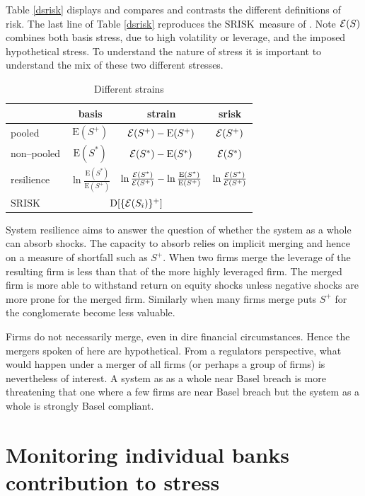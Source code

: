 \documentclass[authoryear]{elsarticle}
\newcommand{\E}{\mathrm{E}}
\newcommand{\Ex}{{\cal E}}
\newcommand{\Es}{\Ex}
\newcommand{\SR}{\ensuremath{\mathrm{SRISK}}}
\newcommand{\tref}[1]{Table \ref{#1}}
\newcommand{\D}{\mathrm{D}}
\begin{document}
 \tref{dsrisk} displays and compares and contrasts the different definitions of risk. The last line of \tref{dsrisk} reproduces the \SR\  measure of \cite{brownlees2015}. Note $\Es(S)$ combines both basis stress, due to high volatility or leverage, and the imposed hypothetical stress. To understand the nature of stress it is important to understand the mix of these two different stresses.
 
 
\begin{table}[htbp]
\caption{Different strains}\label{dsrisk}
\begin{center}
\begin{tabular}{l|c|c|c}
\hline
& basis & strain & srisk\\
\hline
pooled &$\E(S^+)$ &$ \Ex(S^+)-\E(S^+)$ & $\Ex(S^+)$\\
non--pooled & $\E(S^*)$& $\Ex(S^*)-\E(S^*)$&$\Ex(S^*)$\\
\hline
resilience & $\ln\frac{\E(S^*)}{\E(S^+)}$& $\ln\frac{\Ex(S^*)}{\Ex(S^+)}-\ln\frac{\E(S^*)}{\E(S^+)}$&$\ln\frac{\Ex(S^*)}{\Ex(S^+)}$ \\
\hline
\SR & \multicolumn{2}{c}{$\D[\{\Ex(S_i)\}^+]$}\\
\hline
\end{tabular}
\end{center}
\label{default}
\end{table}%

System resilience aims to answer the question of whether the system as a whole can absorb shocks.   The capacity to absorb relies on implicit merging and hence on a measure of shortfall such as $S^+$.    When two firms merge the leverage of the resulting firm is less than that of the more highly leveraged firm.   The merged firm is more able to withstand return on equity shocks  unless negative shocks are more prone for the merged firm.   Similarly when many firms merge  puts $S^+$ for the conglomerate become less valuable.

Firms do not necessarily merge, even in dire financial circumstances.   Hence the mergers spoken of here are hypothetical.   From a regulators perspective, what would happen under a merger of all firms (or perhaps a group of firms) is nevertheless of interest.   A system as as a whole near Basel breach is more threatening that one where a few firms are near Basel breach but the system as a whole is strongly Basel compliant.

\section{Monitoring individual banks contribution to stress}
\end{document}
